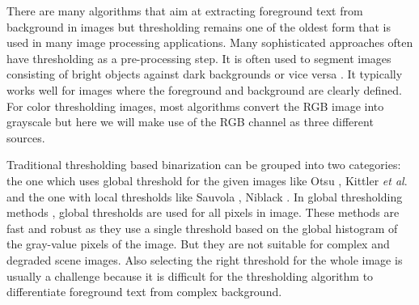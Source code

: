 There are many algorithms that aim at extracting foreground text from background in images but thresholding remains one of
the oldest form that is used in many image processing applications. Many sophisticated approaches often have thresholding as a pre-processing step. 
It is often used to segment images consisting of bright objects against dark backgrounds or vice versa \cite{A1,A3,A4}.
It typically works well for images where the foreground and background are clearly defined.
For color thresholding images, most algorithms convert the 
RGB image into grayscale but here we will make use of the RGB channel as three different sources. 

Traditional thresholding based binarization can be grouped into two categories: the one which uses global
threshold for the given images like Otsu \cite{A2}, Kittler {\em et al}. 
\cite{A5} and the one with local thresholds like Sauvola \cite{A6},
Niblack \cite{A9}. In global thresholding methods \cite{A2,A7}, global thresholds are
used for all pixels in image. These methods are fast and robust as
they use a single threshold based on the global histogram of the gray-value pixels of the image.
But they are not suitable for complex
and degraded scene images. 
Also selecting the right threshold for the whole image is usually a challenge 
because it is difficult for the thresholding
algorithm to differentiate foreground text from complex background.

